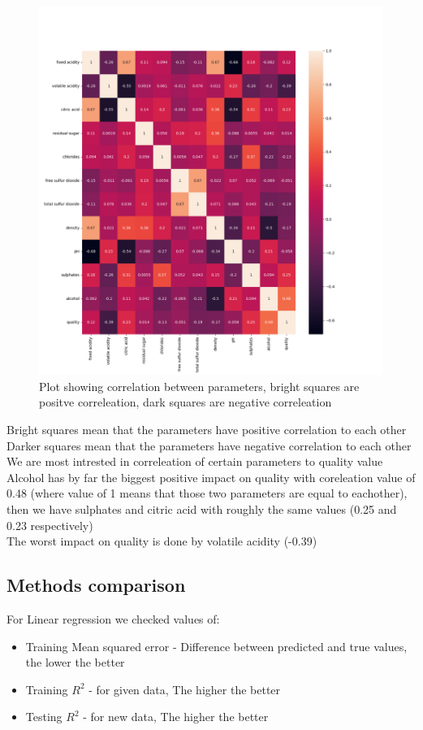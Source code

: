 \documentclass{article}[12pt]
\begin{document}
\begin{figure}[H]
    \caption{Plot showing correlation between parameters, bright squares are positve correleation, dark squares are negative correleation}
    \includegraphics[width=\textwidth]{corr.png}
    \centering
    \end{figure}
Bright squares mean that the parameters have positive correlation to each other \\ 
Darker squares mean that the parameters have negative correlation to each other \\ 
\newpage
We are most intrested in correleation of certain parameters to quality value \\ 
Alcohol has by far the biggest positive impact on quality with coreleation value of 0.48 (where value of 1 means that those two parameters are equal to eachother), then we have sulphates and citric acid with roughly the same values (0.25 and 0.23 respectively) \\ 
The worst impact on quality is done by volatile acidity (-0.39)
\subsection{Methods comparison}
For Linear regression we checked values of:
\begin{itemize}
    \item Training Mean squared error - Difference between predicted and true values, the lower the better
    \item Training $R^2$ - for given data, The higher the better 
    \item Testing $R^2$ - for new data, The higher the better
\end{itemize}
\end{document}
